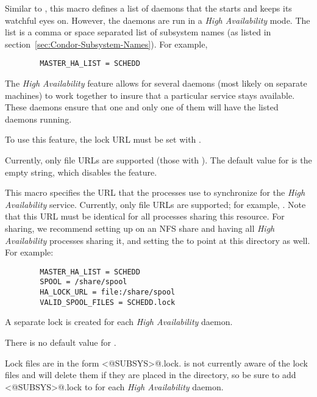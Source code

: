 \begin{description}
\label{param:MasterHAList}
\item[\Macro{MASTER\_HA\_LIST}]
  Similar to , this macro defines a list of daemons that
  the  starts and keeps its watchful eyes on.
  However, the  daemons are run in a
  \emph{High Availability} mode.
  The list is a comma or space separated list of subsystem names
  (as listed in section~\ref{sec:Condor-Subsystem-Names}).
  For example,
  \begin{verbatim}
        MASTER_HA_LIST = SCHEDD
  \end{verbatim}

  The \emph{High Availability} feature allows for several 
  daemons (most likely on separate machines) to work together to
  insure that a particular service stays available.  These
   daemons ensure that one and only one of them will
  have the listed daemons running.

  To use this feature, the lock URL must be set with
  .

  Currently, only file URLs are supported 
  (those with ).
  The default value for  is 
  the empty string, which disables the feature.
  
\label{param:HALockURL}
\item[\Macro{HA\_LOCK\_URL}]
  This macro specifies the URL that the  processes use to
  synchronize for the \emph{High Availability} service.
  Currently, only file URLs are supported; for example,
  .  Note that this URL must be identical
  for all  processes sharing this resource.  For
   sharing, we recommend setting up 
  on an NFS share and having all \emph{High Availability}
   processes sharing it,
  and setting the  to point at this directory
  as well.  For example:
\begin{verbatim}
        MASTER_HA_LIST = SCHEDD
        SPOOL = /share/spool
        HA_LOCK_URL = file:/share/spool
        VALID_SPOOL_FILES = SCHEDD.lock
\end{verbatim}

  A separate lock is created for each \emph{High Availability} daemon.

  There is no default value for .

  Lock files are in the form \verb@<@SUBSYS\verb@>@.lock.
   is not currently aware of the lock files and will
  delete them if they are placed in the  directory,
  so be sure to add \verb@<@SUBSYS\verb@>@.lock to 
   for each \emph{High Availability} daemon.


\end{description}
